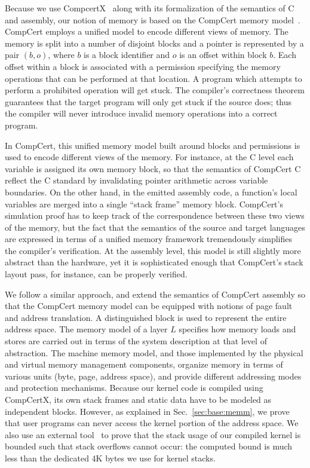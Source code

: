 Because we use CompcertX~\cite{dscal15} along with
its formalization of the semantics of C and assembly,
our notion of memory is based on the CompCert memory model~\cite{leroy08}.
CompCert employs a unified model
to encode different views of memory.
The memory is split into a number of disjoint blocks and
a pointer is represented by a pair $(b, o)$, where
$b$ is a block identifier and
$o$ is an offset within block $b$.
Each offset within a block is associated with a permission
specifying the memory operations that can be performed at that location.
A program which attempts to perform a prohibited operation will get stuck.
The compiler's correctness theorem guarantees that
the target program will only get stuck
if the source does; thus
the compiler will never introduce invalid memory operations
into a correct program.

In CompCert,
this unified memory model built around blocks and permissions
is used to encode different views of the memory.
For instance,
at the C level each variable is assigned its own memory block,
so that the semantics of CompCert C reflect the C standard
by invalidating pointer arithmetic
across variable boundaries.
On the other hand,
in the emitted assembly code,
a function's local variables
are merged into a single ``stack frame'' memory block.
CompCert's simulation proof
has to keep track of the correspondence between these two views of the memory,
but the fact that the semantics of the source and target languages
are expressed in terms of a unified memory framework
tremendously simplifies the compiler's verification.
At the assembly level,
this model is still slightly more abstract than the hardware,
yet it is sophisticated enough that
CompCert's stack layout pass,
for instance,
can be properly verified.

We follow a similar approach,
and extend the semantics of CompCert assembly
so that the CompCert memory model
can be equipped with notions of page fault and address translation.
A distinguished block is used to represent the entire address space.
The memory model of a layer $L$
specifies how memory loads and stores are carried out
in terms of the system description at that level of abstraction.
The machine memory model,
and those implemented by the physical and virtual memory management components,
organize memory in terms of various units (byte, page, address space),
and provide different addressing modes and protection mechanisms.
Because our kernel code is compiled using CompCertX,
its own stack frames and static data have to be modeled as independent blocks.
However, as explained in Sec.~\ref{sec:base:memm},
we prove that user programs can never access
the kernel portion of the address space.
We also use an external tool~\cite{veristack}
to prove that the stack usage of our compiled kernel is bounded
such that stack overflows cannot occur:
the computed bound is much less than the dedicated 4K bytes we use
for kernel stacks.

